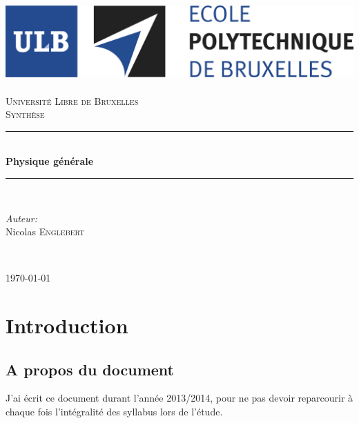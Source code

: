 \documentclass	[11pt, a4paper, openany]{book}
\begin{document}
\renewcommand{\proofname}{Démonstration}
\frontmatter
\begin{titlepage}
\begin{center}	
	
	\newcommand{\HRule}{\rule{\linewidth}{0.5mm}}   			%
	\includegraphics[scale=0.11]{logo.jpg}~\\[1cm]				%

	\textsc{\LARGE Université Libre de Bruxelles}\\[1.5cm]
	\textsc{\Large Synthèse}\\[0.5cm]

	\HRule \\[0.4cm]
	{ \huge \bfseries Physique générale \\[0.4cm] }


	\HRule \\[1.5cm]
		\begin{minipage}{0.4\textwidth}
		\begin{flushleft} \large
		
		\emph{Auteur:}\\
			Nicolas \textsc{Englebert}\\
			\end{flushleft}
			\end{minipage}
			\begin{minipage}{0.4\textwidth}
			\begin{flushright} \large
			\emph{} \\		
			\textsc{}
			\end{flushright}
		\end{minipage}

	\vfill

{\large \today}

\end{center}
\end{titlepage}





\part{Introduction}
\chapter{A propos du document}
J'ai écrit ce document durant l'année 2013/2014, pour ne pas devoir reparcourir à chaque fois l'intégralité des syllabus lors de l'étude.\\
\end{document}
